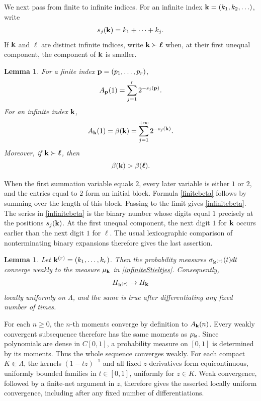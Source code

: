 \documentclass[12pt,a4paper]{amsart}
\makeatletter
\numberwithin{equation}{section}
\renewenvironment{proof}[1][Proof]{%
  \par\pushQED{\qed}%
  \normalfont\topsep6\p@\@plus6\p@\relax
  \trivlist
  \item[\hskip\labelsep\bfseries #1:]\ignorespaces
}{%
  \popQED\endtrivlist\@endpefalse
}
\theoremstyle{plain}
\newtheorem{lem}[Thm]{Lemma}
\theoremstyle{definition}
\makeatother
\begin{document}
We next pass from finite to infinite indices.  For an infinite index
${\bf k}=(k_1,k_2,\ldots)$, write
\[
s_j({\bf k})=k_1+\cdots+k_j.
\]
If ${\bf k}$ and ${\boldsymbol\ell}$ are distinct infinite indices, write
${\bf k}\succ{\boldsymbol\ell}$ when, at their first unequal component, the component of ${\bf k}$ is smaller.

\begin{lem}\label{betamoment}
For a finite index ${\bf p}=(p_1,\ldots,p_r)$,
\begin{equation}\label{finitebeta}
A_{\bf p}(1)=\sum_{j=1}^{r}2^{-s_j({\bf p})}.
\end{equation}
For an infinite index ${\bf k}$,
\begin{equation}\label{infinitebeta}
A_{\bf k}(1)=\beta({\bf k})
=\sum_{j=1}^{+\infty}2^{-s_j({\bf k})}.
\end{equation}
Moreover, if ${\bf k}\succ{\boldsymbol\ell}$, then
\[
\beta({\bf k})>\beta({\boldsymbol\ell}).
\]
\end{lem}

\begin{proof}
When the first summation variable equals $2$, every later variable is either $1$ or $2$, and the entries equal to $2$ form an initial block.  Formula \eqref{finitebeta} follows by summing over the length of this block.  Passing to the limit gives \eqref{infinitebeta}. The series in \eqref{infinitebeta} is the binary number whose digits equal $1$ precisely at the positions $s_j({\bf k})$.  At the first unequal component, the next digit $1$ for ${\bf k}$ occurs earlier than the next digit $1$ for ${\boldsymbol\ell}$.  The usual lexicographic comparison of nonterminating binary expansions therefore gives the last assertion.
\end{proof}

\begin{lem}\label{weakconvergence}
Let ${\bf k}^{(r)}=(k_1,\ldots,k_r)$.  Then the probability measures
$\sigma_{{\bf k}^{(r)}}(t)dt$ converge weakly to the measure $\mu_{\bf k}$ in \eqref{infiniteStieltjes}.  Consequently,
\[
H_{{\bf k}^{(r)}}\rightarrow H_{\bf k}
\]
locally uniformly on $\Lambda$, and the same is true after differentiating any fixed number of times.
\end{lem}

\begin{proof}
For each $n\geq 0$, the $n$-th moments converge by definition to $A_{\bf k}(n)$.  Every weakly convergent subsequence therefore has the same moments as $\mu_{\bf k}$.  Since polynomials are dense in $C[0,1]$, a probability measure on $[0,1]$ is determined by its moments.  Thus the whole sequence converges weakly.  For each compact $K\Subset\Lambda$, the kernels $(1-tz)^{-1}$ and all fixed $z$-derivatives form equicontinuous, uniformly bounded families in $t\in[0,1]$, uniformly for $z\in K$.  Weak convergence, followed by a finite-net argument in $z$, therefore gives the asserted locally uniform convergence, including after any fixed number of differentiations.
\end{proof}
\end{document}
